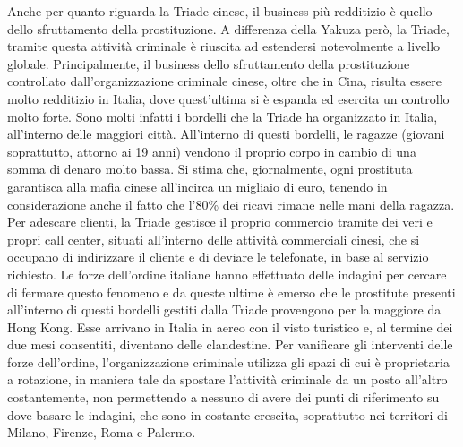\documentclass[a4paper, 11pt]{article}
\begin{document}

Anche per quanto riguarda la Triade cinese, il business più redditizio è quello dello sfruttamento della prostituzione. A differenza della Yakuza però, la Triade, tramite questa attività criminale è riuscita ad estendersi notevolmente a livello globale. Principalmente, il business dello sfruttamento della prostituzione controllato dall’organizzazione criminale cinese, oltre che in Cina, risulta essere molto redditizio in Italia, dove quest’ultima si è espanda ed esercita un controllo molto forte. Sono molti infatti i bordelli che la Triade ha organizzato in Italia, all’interno delle maggiori città. All’interno di questi bordelli, le ragazze (giovani soprattutto, attorno ai 19 anni) vendono il proprio corpo in cambio di una somma di denaro molto bassa. Si stima che, giornalmente, ogni prostituta garantisca alla mafia cinese all’incirca un migliaio di euro, tenendo in considerazione anche il fatto che l’80\% dei ricavi rimane nelle mani della ragazza. Per adescare clienti, la Triade gestisce il proprio commercio tramite dei veri e propri call center, situati all’interno delle attività commerciali cinesi, che si occupano di indirizzare il cliente e di deviare le telefonate, in base al servizio richiesto. Le forze dell’ordine italiane hanno effettuato delle indagini per cercare di fermare questo fenomeno e da queste ultime è emerso che le prostitute presenti all’interno di questi bordelli gestiti dalla Triade provengono per la maggiore da Hong Kong. Esse arrivano in Italia in aereo con il visto turistico e, al termine dei due mesi consentiti, diventano delle clandestine. Per vanificare gli interventi delle forze dell’ordine, l’organizzazione criminale utilizza gli spazi di cui è proprietaria a rotazione, in maniera tale da spostare l’attività criminale da un posto all’altro costantemente, non permettendo a nessuno di avere dei punti di riferimento su dove basare le indagini, che sono in costante crescita, soprattutto nei territori di Milano, Firenze, Roma e Palermo.

\newpage
\end{document}

